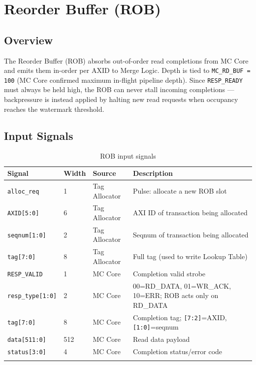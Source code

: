 \section{Reorder Buffer (ROB)}
\subsection{Overview}

The Reorder Buffer (ROB) absorbs out-of-order read completions from MC Core and emits them in-order per AXID to Merge Logic. Depth is tied to \texttt{MC\_RD\_BUF = 100} (MC Core confirmed maximum in-flight pipeline depth). Since \texttt{RESP\_READY} must always be held high, the ROB can never stall incoming completions — backpressure is instead applied by halting new read requests when occupancy reaches the watermark threshold.

\subsection*{Input Signals}
\begin{longtable}{p{3cm}p{1cm}p{3cm}p{7cm}}
\toprule
\textbf{Signal} & \textbf{Width} & \textbf{Source} & \textbf{Description} \\
\midrule
\texttt{alloc\_req}     & 1   & Tag Allocator & Pulse: allocate a new ROB slot \\
\texttt{AXID[5:0]}      & 6   & Tag Allocator & AXI ID of transaction being allocated \\
\texttt{seqnum[1:0]}    & 2   & Tag Allocator & Seqnum of transaction being allocated \\
\texttt{tag[7:0]}       & 8   & Tag Allocator & Full tag (used to write Lookup Table) \\
\texttt{RESP\_VALID}    & 1   & MC Core       & Completion valid strobe \\
\texttt{resp\_type[1:0]}& 2   & MC Core       & 00=RD\_DATA, 01=WR\_ACK, 10=ERR; ROB acts only on RD\_DATA \\
\texttt{tag[7:0]}       & 8   & MC Core       & Completion tag; \texttt{[7:2]}=AXID, \texttt{[1:0]}=seqnum \\
\texttt{data[511:0]}    & 512 & MC Core       & Read data payload \\
\texttt{status[3:0]}    & 4   & MC Core       & Completion status/error code \\
\bottomrule
\caption{ROB input signals}
\end{longtable}

